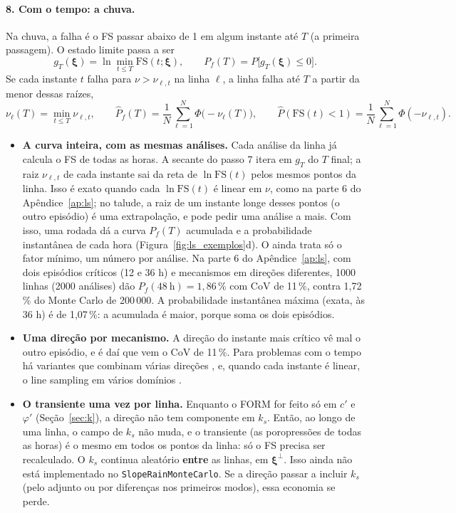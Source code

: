 \documentclass[11pt,a4paper]{article}
\newcommand{\xib}{\bm\xi}
\newcommand{\FS}{\mathrm{FS}}
\begin{document}
\paragraph{8. Com o tempo: a chuva.} Na chuva, a falha é o FS passar abaixo de 1 em algum instante até $T$ (a primeira
passagem). O estado limite passa a ser
\begin{equation}
  g_T(\xib) = \ln\min_{t \le T}\FS(t; \xib), \qquad P_f(T) = P\big[g_T(\xib) \le 0\big].
  \label{eq:lstempo}
\end{equation}
Se cada instante $t$ falha para $\nu > \nu_{\ell,t}$ na linha $\ell$, a linha falha até $T$ a partir da menor dessas raízes,
\begin{equation}
  \nu_\ell(T) = \min_{t \le T} \nu_{\ell,t}, \qquad \hat P_f(T) = \frac{1}{N}\sum_{\ell=1}^{N}\Phi\big(-\nu_\ell(T)\big), \qquad
  \hat P(\FS(t) < 1) = \frac{1}{N}\sum_{\ell=1}^{N}\Phi(-\nu_{\ell,t}).
  \label{eq:lstempoest}
\end{equation}
\begin{itemize}
  \item \textbf{A curva inteira, com as mesmas análises.} Cada análise da linha já calcula o FS de todas as horas. A secante do
    passo 7 itera em $g_T$ do $T$ final; a raiz $\nu_{\ell,t}$ de cada instante sai da reta de $\ln\FS(t)$ pelos mesmos
    pontos da linha. Isso é exato quando cada $\ln\FS(t)$ é linear em $\nu$, como na parte 6 do Apêndice~\ref{ap:ls}; no
    talude, a raiz de um instante longe desses pontos (o outro episódio) é uma extrapolação, e pode pedir uma análise a
    mais. Com isso, uma rodada dá a curva $P_f(T)$ acumulada e a probabilidade instantânea de cada hora
    (Figura~\ref{fig:ls_exemplos}d). O  ainda trata só o fator mínimo, um número por análise. Na parte 6 do
    Apêndice~\ref{ap:ls}, com dois episódios críticos (12 e 36 h) e mecanismos em direções diferentes, 1000 linhas
    (2000 análises) dão $P_f(48\ \mathrm h) = 1{,}86\,\%$ com CoV de 11\,\%, contra 1,72\,\% do Monte Carlo de 200\,000. A
    probabilidade instantânea máxima (exata, às 36 h) é de 1,07\,\%: a acumulada é maior, porque soma os dois episódios.
  \item \textbf{Uma direção por mecanismo.} A direção do instante mais crítico vê mal o outro episódio, e é daí que vem
    o CoV de 11\,\%. Para problemas com o tempo há variantes que combinam várias direções \citep{yuan2024}, e, quando
    cada instante é linear, o line sampling em vários domínios \citep{valdebenito2021}.
  \item \textbf{O transiente uma vez por linha.} Enquanto o FORM for feito só em $c'$ e $\varphi'$
    (Seção~\ref{sec:k}), a direção não tem componente em $k_s$. Então, ao longo de uma linha, o campo de $k_s$ não muda, e o transiente (as poropressões de
    todas as horas) é o mesmo em todos os pontos da linha: só o FS precisa ser recalculado. O $k_s$ continua aleatório
    \textbf{entre} as linhas, em $\xib^\perp$. Isso ainda não está implementado no \texttt{SlopeRainMonteCarlo}. Se a direção passar a incluir $k_s$ (pelo adjunto ou
    por diferenças nos primeiros modos), essa economia se perde.
\end{itemize}
\end{document}
